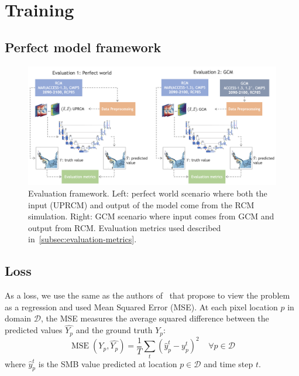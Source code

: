 \documentclass[a4paper,11pt,oneside]{report}
\begin{document}
\section{Training}\label{subsec:training}
\subsection{Perfect model framework}\label{subsec:perfect-model-training}
\begin{figure}[!t]
  \centering
  \includegraphics[width=\columnwidth]{images/evaluation_framework.png}
  \caption []{\small Evaluation framework. Left: perfect world scenario where both the input (UPRCM) and output of the model come from the RCM simulation. Right: GCM scenario where input comes from GCM and output from RCM. Evaluation metrics used described in~\ref{subsec:evaluation-metrics}.}
  \vspace{-3mm}
  \label{fig:evaluation-framework}
\end{figure}


\subsection{Loss}\label{subsec:loss}
As a loss, we use the same as the authors of~\cite{Doury} that propose to view the problem as a regression and used Mean Squared Error (MSE). At each pixel location $p$ in domain $\mathcal{D}$, the MSE measures the average squared difference between the predicted values $\widehat{Y_{p}}$ and the ground truth $Y_{p}$:
\begin{equation}
        \operatorname{MSE}\left(Y_{p},\widehat{Y_{p}}\right) = \frac{1}{T}\sum_{t}(\hat{y}_{p}^{t}-y^{t}_{p})^2   \;\;\;\; \forall p \in \mathcal{D} 
\end{equation}
where $\hat{y}_{p}^{t}$ is the SMB value predicted at location $p\in \mathcal{D} $ and time step $t$.
\end{document}
